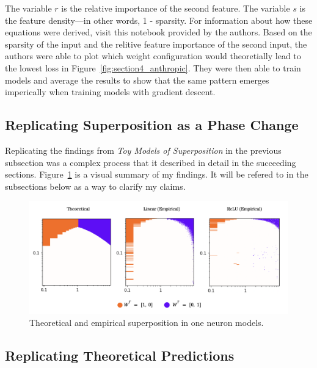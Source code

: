 \documentclass{article} %
\begin{document}
The variable $r$ is the relative importance of the second feature. The variable
$s$ is the feature density---in other words, 1 - sparsity. For information
about how these equations were derived, visit this notebook provided by the authors.
Based on the sparsity of the input and the relitive feature
importance of the second input, the authors were able to plot which weight configuration
would theoretially lead to the lowest loss in Figure~\ref{fig:section4_anthropic}.
They were then able to train models and average the results to show that the
same pattern emerges imperically when training models with gradient descent.

\subsection{Replicating Superposition as a Phase Change}

Replicating the findings from \textit{Toy Models of Superposition} in the
previous subsection was a complex process that it described in detail in the
succeeding sections. Figure~\ref{fig:phase_changes_replication} is a visual
summary of my findings. It will be refered to in the subsections below as a
way to clarify my claims.

\begin{figure}[h]
    \centering
    \includegraphics[width=0.99\linewidth]{phase_changes/images/phase_changes_replication.png}
    \captionsetup{font=footnotesize, width=0.7\linewidth} %
    \caption{
        Theoretical and empirical superposition in one neuron models.
    }
    \label{fig:phase_changes_replication}
\end{figure}

\subsection{Replicating Theoretical Predictions}
\end{document}
